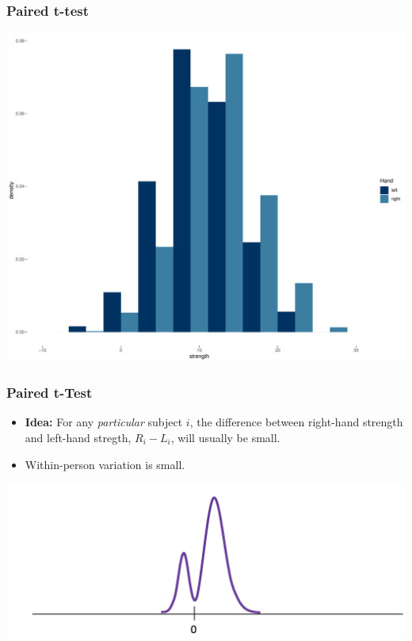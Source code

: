 \documentclass[12pt, block=fill]{beamer}
\begin{document}
\begin{frame}
  \frametitle{Paired t-test}
  \centering
  \includegraphics[width=.9\linewidth]{./figures/histogram_unpaired.pdf}
\end{frame}

\begin{frame}
  \frametitle{Paired t-Test}

  \begin{itemize}
  \item \textbf{Idea:} For any \textit{particular} subject $i$, the difference
    between right-hand strength and left-hand stregth, $R_i - L_i$,
    will usually be small.
  \item Within-person variation is small.
  \end{itemize}

  \begin{center}
    \includegraphics[width=.9\linewidth]{./figures/grip}
  \end{center}
\end{frame}
\end{document}
